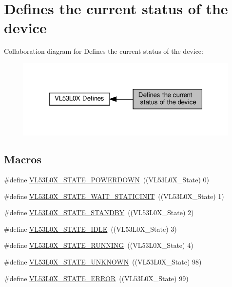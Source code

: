 \hypertarget{group__VL53L0X__define__State__group}{}\section{Defines the current status of the device}
\label{group__VL53L0X__define__State__group}
Collaboration diagram for Defines the current status of the device\+:\nopagebreak
\begin{figure}[H]
\begin{center}
\leavevmode
\includegraphics[width=315pt]{group__VL53L0X__define__State__group}
\end{center}
\end{figure}
\subsection*{Macros}
\begin{DoxyCompactItemize}
\item 
\#define \hyperlink{group__VL53L0X__define__State__group_gadc7ed3137681a4fcf1021e9e55a9dc35}{V\+L53\+L0\+X\+\_\+\+S\+T\+A\+T\+E\+\_\+\+P\+O\+W\+E\+R\+D\+O\+WN}~((V\+L53\+L0\+X\+\_\+\+State)  0)
\item 
\#define \hyperlink{group__VL53L0X__define__State__group_gae1ac367449ae3fdd4f508c642fe1c530}{V\+L53\+L0\+X\+\_\+\+S\+T\+A\+T\+E\+\_\+\+W\+A\+I\+T\+\_\+\+S\+T\+A\+T\+I\+C\+I\+N\+IT}~((V\+L53\+L0\+X\+\_\+\+State)  1)
\item 
\#define \hyperlink{group__VL53L0X__define__State__group_gaf46fb23dab2f5344860a10c1938885b2}{V\+L53\+L0\+X\+\_\+\+S\+T\+A\+T\+E\+\_\+\+S\+T\+A\+N\+D\+BY}~((V\+L53\+L0\+X\+\_\+\+State)  2)
\item 
\#define \hyperlink{group__VL53L0X__define__State__group_ga074c4b38507044ec430d5a0254f5b57d}{V\+L53\+L0\+X\+\_\+\+S\+T\+A\+T\+E\+\_\+\+I\+D\+LE}~((V\+L53\+L0\+X\+\_\+\+State)  3)
\item 
\#define \hyperlink{group__VL53L0X__define__State__group_gae6638c8138a8dcfe752e9ebd6e2bcf40}{V\+L53\+L0\+X\+\_\+\+S\+T\+A\+T\+E\+\_\+\+R\+U\+N\+N\+I\+NG}~((V\+L53\+L0\+X\+\_\+\+State)  4)
\item 
\#define \hyperlink{group__VL53L0X__define__State__group_ga3ebef117a1cd195911d8d988c2778704}{V\+L53\+L0\+X\+\_\+\+S\+T\+A\+T\+E\+\_\+\+U\+N\+K\+N\+O\+WN}~((V\+L53\+L0\+X\+\_\+\+State)  98)
\item 
\#define \hyperlink{group__VL53L0X__define__State__group_ga29a332f5cb56dfc3a521e6f5955ea29b}{V\+L53\+L0\+X\+\_\+\+S\+T\+A\+T\+E\+\_\+\+E\+R\+R\+OR}~((V\+L53\+L0\+X\+\_\+\+State)  99)
\end{DoxyCompactItemize}

